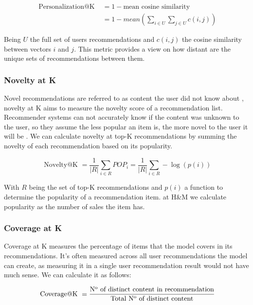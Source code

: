 \documentclass{kththesis}
\newcommand*{\Num}{N\textsuperscript{o}\xspace}
\begin{document}
\begin{equation}
\begin{aligned}
\text { Personalization@K } &= 1 - \text{mean cosine similarity} \\
&= 1 - mean(\sum_{i \in U}\sum_{j \in U}c(i,j))
\end{aligned}
\end{equation}

Being $U$ the full set of users recommendations and $c(i,j)$ the cosine similarity between vectors $i$ and $j$. This metric provides a view on how distant are the unique sets of recommendations between them.


\subsubsection{Novelty at K}
Novel recommendations are referred to as content the user did not know about \cite{noveltyintro}, novelty at K aims to measure the novelty score of a recommendation list. Recommender systems can not accurately know if the content was unknown to the user, so they assume the less popular an item is, the more novel to the user it will be \cite{noveltyassumption}. We can calculate novelty at top-K recommendations by summing the novelty of each recommendation based on its popularity. 


\begin{equation}
\text { Novelty@K }=\frac{1}{|R|} \sum_{i \in R} P O P_{i}=\frac{1}{|R|} \sum_{i \in R}-\log (p(i))
\end{equation}

With $R$ being the set of top-K recommendations and $p(i)$ a function to determine the popularity of a recommendation item. at H\&M we calculate popularity as the number of sales the item has.

\subsubsection{Coverage at K}
Coverage at K measures the percentage of items that the model covers in its recommendations. It's often measured across all user recommendations the model can create, as measuring it in a single user recommendation result would not have much sense. We can calculate it as follows:

\begin{equation}
\text { Coverage@K }= \frac{\text{\Num  of distinct content in recommendation}}{\text{Total \Num  of distinct content}}
\end{equation}
\end{document}
